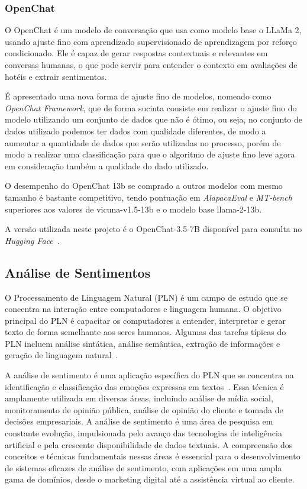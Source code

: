 \subsubsection{OpenChat}
\label{cap:fund_teorica:sec:modelos:subsec:openchat}

O OpenChat \cite{wang2024openchat} é um modelo de conversação que usa como modelo base o LLaMa 2, usando ajuste fino com aprendizado supervisionado de aprendizagem por reforço condicionado. Ele é capaz de gerar respostas contextuais e relevantes em conversas humanas, o que pode servir para entender o contexto em avaliações de hotéis e extrair sentimentos.

É apresentado uma nova forma de ajuste fino de modelos, nomeado como \textit{OpenChat Framework}, que de forma sucinta consiste em realizar o ajuste fino do modelo utilizando um conjunto de dados que não é ótimo, ou seja, no conjunto de dados utilizado podemos ter dados com qualidade diferentes, de modo a aumentar a quantidade de dados que serão utilizadas no processo, porém de modo a realizar uma classificação para que o algoritmo de ajuste fino leve agora em consideração também a qualidade do dado utilizado.

O desempenho do OpenChat 13b se comprado a outros modelos com mesmo tamanho é bastante competitivo, tendo pontuação em \textit{AlapacaEval} e \textit{MT-bench} superiores aos valores de vicuna-v1.5-13b e o modelo base llama-2-13b.

A versão utilizada neste projeto é o OpenChat-3.5-7B disponível para consulta no \textit{Hugging Face}~\cite{openChat357b}.

\subsection{Análise de Sentimentos}
\label{cap:fund_teorica:sec:analise_sentimento}

O Processamento de Linguagem Natural (PLN) é um campo de estudo que se concentra na interação entre computadores e linguagem humana. O objetivo principal do PLN é capacitar os computadores a entender, interpretar e gerar texto de forma semelhante aos seres humanos. Algumas das tarefas típicas do PLN incluem análise sintática, análise semântica, extração de informações e geração de linguagem natural~\cite{anchieta2021pln}.

A análise de sentimento é uma aplicação específica do PLN que se concentra na identificação e classificação das emoções expressas em textos~\cite{Liu2012}. Essa técnica é amplamente utilizada em diversas áreas, incluindo análise de mídia social, monitoramento de opinião pública, análise de opinião do cliente e tomada de decisões empresariais. A análise de sentimento é uma área de pesquisa em constante evolução, impulsionada pelo avanço das tecnologias de inteligência artificial e pela crescente disponibilidade de dados textuais. A compreensão dos conceitos e técnicas fundamentais nessas áreas é essencial para o desenvolvimento de sistemas eficazes de análise de sentimento, com aplicações em uma ampla gama de domínios, desde o marketing digital até a assistência virtual ao cliente.

